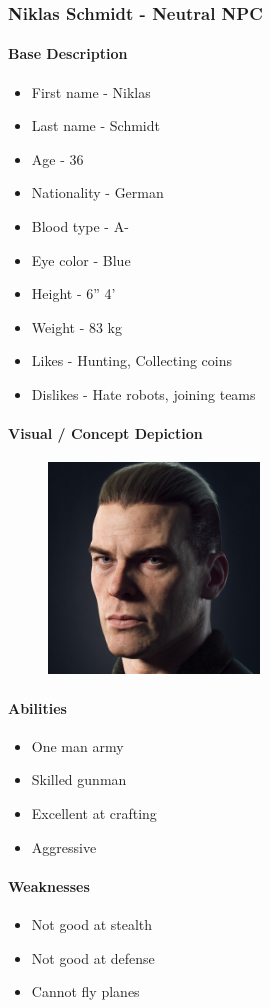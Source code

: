 \subsubsection{Niklas Schmidt - Neutral NPC}
	\paragraph{Base Description}\mbox{}
		\begin{itemize}
			\item First name - Niklas
			\item Last name - Schmidt
			\item Age - 36
			\item Nationality - German
			\item Blood type - A-
			\item Eye color - Blue
			\item Height - 6” 4’
			\item Weight - 83 kg
			\item Likes - Hunting, Collecting coins
			\item Dislikes - Hate robots, joining teams
		\end{itemize}
	\paragraph{Visual / Concept Depiction}\mbox{}
		\begin{figure}[H]
			\centering
			\includegraphics[width=0.5\textwidth]{images/characters/schmidt}
		\end{figure}
	\paragraph{Abilities}\mbox{}
		\begin{itemize}
			\item One man army
			\item Skilled gunman
			\item Excellent at crafting
			\item Aggressive
		\end{itemize}
	\paragraph{Weaknesses}\mbox{}
		\begin{itemize}
			\item Not good at stealth
			\item Not good at defense
			\item Cannot fly planes
        \end{itemize}